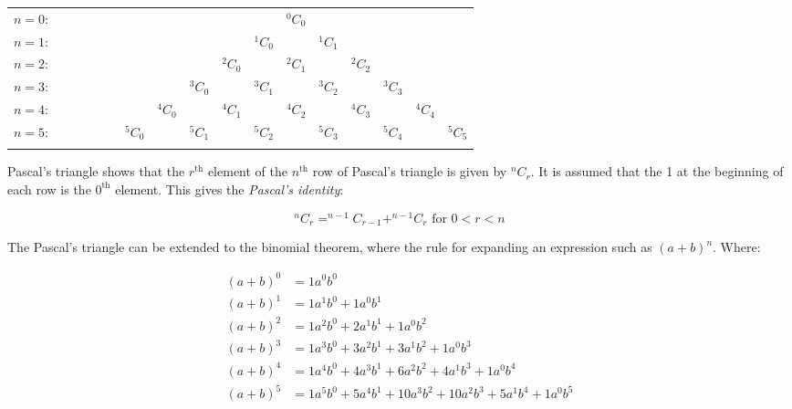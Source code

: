 \documentclass{book}
\begin{document}
\begin{center}
	\begin{tabular}{rcccccccccccccccc}
		$n=0$: &  &  &  &  &  &         &         &         &         &         & $^0C_0$                                                   \\ \noalign{\smallskip\smallskip}
		$n=1$: &  &  &  &  &  &         &         &         &         & $^1C_0$ &         & $^1C_1$                                         \\ \noalign{\smallskip\smallskip}
		$n=2$: &  &  &  &  &  &         &         &         & $^2C_0$ &         & $^2C_1$ &         & $^2C_2$                               \\ \noalign{\smallskip\smallskip}
		$n=3$: &  &  &  &  &  &         &         & $^3C_0$ &         & $^3C_1$ &         & $^3C_2$ &         & $^3C_3$                     \\ \noalign{\smallskip\smallskip}
		$n=4$: &  &  &  &  &  &         & $^4C_0$ &         & $^4C_1$ &         & $^4C_2$ &         & $^4C_3$ &         & $^4C_4$           \\ \noalign{\smallskip\smallskip}
		$n=5$: &  &  &  &  &  & $^5C_0$ &         & $^5C_1$ &         & $^5C_2$ &         & $^5C_3$ &         & $^5C_4$ &         & $^5C_5$ \\ \noalign{\smallskip\smallskip}
	\end{tabular}
\end{center}

Pascal's triangle shows that the $r^\text{th}$ element of the $n^\text{th}$ row of Pascal's triangle is given by $^nC_r$.  It is assumed that the 1 at the beginning of each row is the $0^\text{th}$ element.  This gives the \emph{Pascal's identity}:

\[^nC_r = ^{n-1}C_{r-1} + ^{n-1}C_r \text{ for } 0 < r < n\]

The Pascal's triangle can be extended to the binomial theorem, where the rule for expanding an expression such as $(a + b)^n$.  Where:

\begin{align*}
	(a + b)^0 & = 1a^0b^0                                                     \\
	(a + b)^1 & = 1a^1b^0 + 1a^0b^1                                           \\
	(a + b)^2 & = 1a^2b^0 + 2a^1b^1 + 1a^0b^2                                 \\
	(a + b)^3 & = 1a^3b^0 + 3a^2b^1 + 3a^1b^2 + 1a^0b^3                       \\
	(a + b)^4 & = 1a^4b^0 + 4a^3b^1 + 6a^2b^2 + 4a^1b^3 + 1a^0b^4             \\
	(a + b)^5 & = 1a^5b^0 + 5a^4b^1 + 10a^3b^2 + 10a^2b^3 + 5a^1b^4 + 1a^0b^5
\end{align*}
\end{document}
